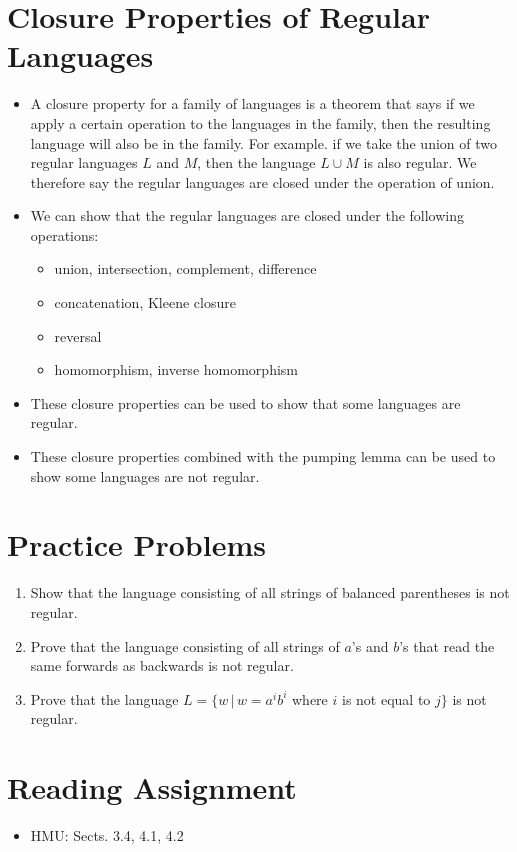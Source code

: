 \documentclass[]{article}
\begin{document}
\section{Closure Properties of Regular Languages}
  \begin{itemize}
    \item A closure property for a family of languages is a theorem that says if
    we apply a certain operation to the languages in the family, then the
    resulting language will also be in the family. For example. if we take the
    union of two regular languages $L$ and $M$, then the language $L \cup M$ is
    also regular. We therefore say the regular languages are closed under the
    operation of union.
    \item We can show that the regular languages are closed under the following
    operations:
      \begin{itemize}
        \item union, intersection, complement, difference
        \item concatenation, Kleene closure
        \item reversal
        \item homomorphism, inverse homomorphism
      \end{itemize}
    \item These closure properties can be used to show that some languages are
    regular.
    \item These closure properties combined with the pumping lemma can be used
    to show some languages are not regular.
  \end{itemize}

\section{Practice Problems}
  \begin{enumerate}
    \item Show that the language consisting of all strings of balanced
    parentheses is not regular.
    \item Prove that the language consisting of all strings of $a$'s and $b$'s
    that read the same forwards as backwards is not regular.
    \item Prove that the language $L = \{ w \, | \, w = a^ib^i$ where $i$ is not
    equal to $j \}$ is not regular.
  \end{enumerate}

\section{Reading Assignment}
  \begin{itemize}
    \item HMU: Sects. 3.4, 4.1, 4.2
  \end{itemize}
\end{document}
